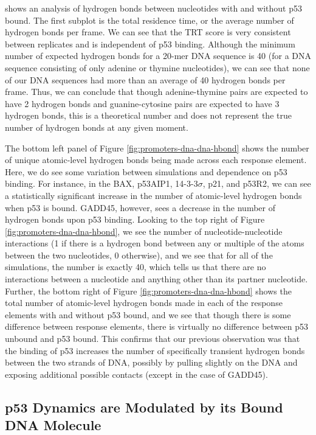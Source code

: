 shows an analysis of hydrogen bonds between nucleotides with and without p53 bound. The first subplot is the total residence time, or the average number of hydrogen bonds per frame. We can see that the TRT score is very consistent between replicates and is independent of p53 binding. Although the minimum number of expected hydrogen bonds for a \num{20}-mer DNA sequence is \num{40} (for a DNA sequence consisting of only adenine or thymine nucleotides), we can see that none of our DNA sequences had more than an average of \num{40} hydrogen bonds per frame. Thus, we can conclude that though adenine-thymine pairs are expected to have \num{2} hydrogen bonds and guanine-cytosine pairs are expected to have \num{3} hydrogen bonds, this is a theoretical number and does not represent the true number of hydrogen bonds at any given moment.

The bottom left panel of Figure \ref{fig:promoters-dna-dna-hbond} shows the number of unique atomic-level hydrogen bonds being made across each response element. Here, we do see some variation between simulations and dependence on p53 binding. For instance, in the BAX, p53AIP1, 14-3-3\(\sigma\), p21, and p53R2, we can see a statistically significant increase in the number of atomic-level hydrogen bonds when p53 is bound. GADD45, however, sees a decrease in the number of hydrogen bonds upon p53 binding. Looking to the top right of Figure \ref{fig:promoters-dna-dna-hbond}, we see the number of nucleotide-nucleotide interactions (\num{1} if there is a hydrogen bond between any or multiple of the atoms between the two nucleotides, \num{0} otherwise), and we see that for all of the simulations, the number is exactly 40, which tells us that there are no interactions between a nucleotide and anything other than its partner nucleotide. Further, the bottom right of Figure \ref{fig:promoters-dna-dna-hbond} shows the total number of atomic-level hydrogen bonds made in each of the response elements with and without p53 bound, and we see that though there is some difference between response elements, there is virtually no difference between p53 unbound and p53 bound. This confirms that our previous observation was that the binding of p53 increases the number of specifically transient hydrogen bonds between the two strands of DNA, possibly by pulling slightly on the DNA and exposing additional possible contacts (except in the case of GADD45).

\subsection{p53 Dynamics are Modulated by its Bound DNA Molecule}

